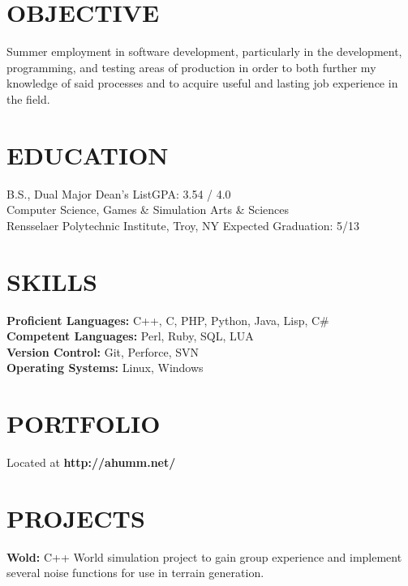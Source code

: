 \documentclass[margin,11pt]{res} %
\begin{document}

\address{{\bf Permanent Address} \\  9845 NE 27th st  \\ Bellevue, WA, 98004}
\address{ {\bf Contact Info} \\ tate.larsen@ahumm.net \\(425) 283-3847}

\begin{resume}
\section{OBJECTIVE}  
    Summer employment in software development, particularly in the development, programming, and testing areas of production in order to both further my knowledge of said processes and to acquire useful and lasting job experience in the field.

 
\section{EDUCATION}       B.S., Dual Major \hfill Dean's List\hfill GPA: 3.54 / 4.0 \\
                Computer Science, Games \& Simulation Arts \& Sciences  \\
                Rensselaer Polytechnic Institute, Troy, NY \hfill Expected Graduation: 5/13
 
\section{SKILLS}       {\bf Proficient Languages:} C++, C, PHP, Python, Java, Lisp, C\# \\
                {\bf Competent Languages:} Perl, Ruby, SQL, LUA \\
                {\bf Version Control:} Git, Perforce, SVN \\
                {\bf Operating Systems:} Linux, Windows
 
\section{PORTFOLIO}      {Located at {\bf http://ahumm.net/}}

\section{PROJECTS}
                {{\bf Wold:} C++ World simulation project to gain group experience and implement several noise functions for use in terrain generation.}


\end{resume}
\end{document}

